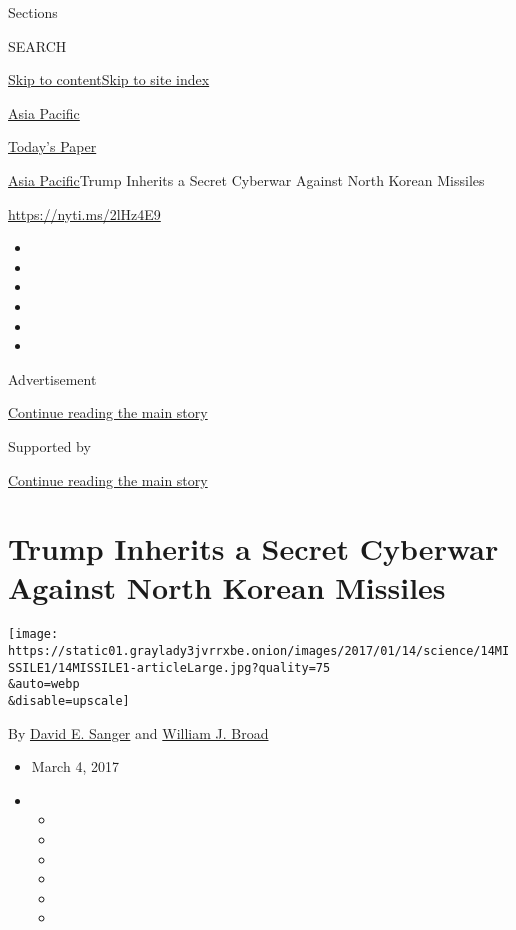 Sections

SEARCH

\protect\hyperlink{site-content}{Skip to
content}\protect\hyperlink{site-index}{Skip to site index}

\href{https://www.nytimes3xbfgragh.onion/section/world/asia}{Asia
Pacific}

\href{https://myaccount.nytimes3xbfgragh.onion/auth/login?response_type=cookie\&client_id=vi}{}

\href{https://www.nytimes3xbfgragh.onion/section/todayspaper}{Today's
Paper}

\href{/section/world/asia}{Asia Pacific}\textbar{}Trump Inherits a
Secret Cyberwar Against North Korean Missiles

\url{https://nyti.ms/2lHz4E9}

\begin{itemize}
\item
\item
\item
\item
\item
\item
\end{itemize}

Advertisement

\protect\hyperlink{after-top}{Continue reading the main story}

Supported by

\protect\hyperlink{after-sponsor}{Continue reading the main story}

\hypertarget{trump-inherits-a-secret-cyberwar-against-north-korean-missiles}{%
\section{Trump Inherits a Secret Cyberwar Against North Korean
Missiles}\label{trump-inherits-a-secret-cyberwar-against-north-korean-missiles}}

\texttt{[image: https://static01.graylady3jvrrxbe.onion/images/2017/01/14/science/14MISSILE1/14MISSILE1-articleLarge.jpg?quality=75\\\&auto=webp\\\&disable=upscale]}

By \href{http://www.nytimes3xbfgragh.onion/by/david-e-sanger}{David E.
Sanger} and
\href{http://www.nytimes3xbfgragh.onion/by/william-j-broad}{William J.
Broad}

\begin{itemize}
\item
  March 4, 2017
\item
  \begin{itemize}
  \item
  \item
  \item
  \item
  \item
  \item
  \end{itemize}
\end{itemize}

